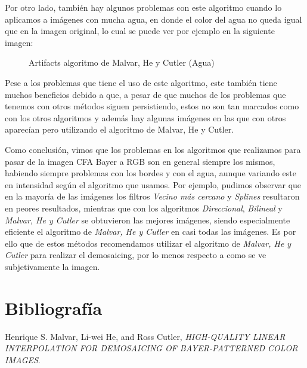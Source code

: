 \documentclass[10pt, a4paper]{article}
\begin{document}
Por otro lado, tambi\'en hay algunos problemas con este algoritmo cuando lo aplicamos a im\'agenes con mucha agua, en donde el color del agua no queda igual que en la imagen original, lo cual se puede ver por ejemplo en la siguiente imagen:

\begin{figure}[H]
\centering
	\caption{Artifacts algoritmo de Malvar, He y Cutler (Agua)} 
\end{figure}

Pese a los problemas que tiene el uso de este algoritmo, este tambi\'en tiene muchos beneficios debido a que, a pesar de que muchos de los problemas que tenemos con otros m\'etodos siguen persistiendo, estos no son tan marcados como con los otros algoritmos y adem\'as hay algunas im\'agenes en las que con otros aparec\'ian pero utilizando el algoritmo de Malvar, He y Cutler.

Como conclusi\'on, vimos que los problemas en los algoritmos que realizamos para pasar de la imagen CFA Bayer a RGB son en general siempre los mismos, habiendo siempre problemas con los bordes y con el agua, aunque variando este en intensidad seg\'un el algoritmo que usamos. Por ejemplo, pudimos observar que en la mayor\'ia de las im\'agenes los filtros \textit{Vecino m\'as cercano} y \textit{Splines} resultaron en peores resultados, mientras que con los algoritmos \textit{Direccional}, \textit{Bilineal} y \textit{Malvar, He y Cutler} se obtuvieron las mejores im\'agenes, siendo especialmente eficiente el algoritmo de \textit{Malvar, He y Cutler} en casi todas las im\'agenes. Es por ello que de estos m\'etodos recomendamos utilizar el algoritmo de \textit{Malvar, He y Cutler} para realizar el demosaicing, por lo menos respecto a como se ve subjetivamente la imagen.
\section{Bibliograf\'ia}

\begin{thebibliography}{5}

  Henrique S. Malvar, Li-wei He, and Ross Cutler,
  \emph{HIGH-QUALITY LINEAR INTERPOLATION FOR DEMOSAICING OF BAYER-PATTERNED COLOR IMAGES}.
  
\end{thebibliography}
\end{document}
